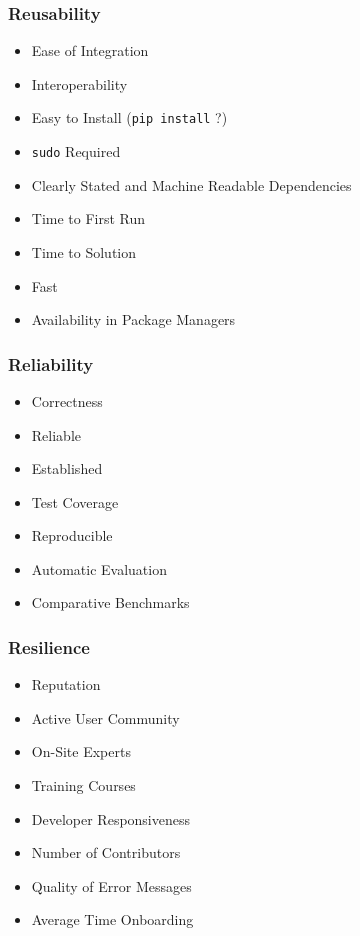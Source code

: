 \documentclass[aspectratio=1610,10pt]{penchbeamer}
\begin{document}
\begin{frame}
  \frametitle{Reusability}

  \begin{itemize}
    \item Ease of Integration
    \item Interoperability
    \item Easy to Install (\texttt{pip install} ?)
    \item \texttt{sudo} Required
    \item Clearly Stated and Machine Readable Dependencies
    \item Time to First Run
    \item Time to Solution
    \item Fast
    \item Availability in Package Managers
  \end{itemize}
\end{frame}

\begin{frame}
  \frametitle{Reliability}

  \begin{itemize}
    \item Correctness
    \item Reliable
    \item Established
    \item Test Coverage
    \item Reproducible
    \item Automatic Evaluation
    \item Comparative Benchmarks
  \end{itemize}
\end{frame}

\begin{frame}
  \frametitle{Resilience}
  \begin{itemize}
    \item Reputation
    \item Active User Community
    \item On-Site Experts
    \item Training Courses
    \item Developer Responsiveness
    \item Number of Contributors
    \item Quality of Error Messages
    \item Average Time Onboarding
  \end{itemize}

\end{frame}
\end{document}
